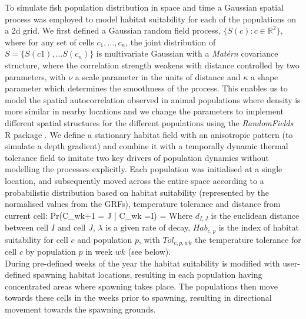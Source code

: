 \documentclass[review]{elsarticle}
\let\oldequation\equation
\let\oldendequation\endequation
\renewenvironment{equation}
 {\linenomathNonumbers\oldequation}
 {\oldendequation\endlinenomath}
\begin{document}
To simulate fish population distribution in space and time a Gaussian spatial
process was employed to model habitat suitability for each of the populations
on a 2d grid.  We first defined a Gaussian random field process, $\{S(c) : c
\in \mathbb{R}^2\}$, where for any set of cells $c_{1}, \dots, c_{n}$, the
joint distribution of $S = \{S(c1),\dots S(c_{n})\}$ is multivariate Gaussian
with a \textit{Matérn} covariance structure, where the correlation strength
weakens with distance controlled by two parameters, with $\nu$ a scale
parameter in the units of distance and $\kappa$ a shape parameter which
determines the smoothness of the process. This enables us to model the spatial
autocorrelation observed in animal populations where density is more similar in
nearby locations \citep{Tobler1970, F.Dormann2007, Poos2007} and we change the
parameters to implement different spatial structures for the different
populations using the \textit{RandomFields} R package \citep{Schlater2015}. We
define a stationary habitat field with an anisotropic pattern (to simulate a
depth gradient) and combine it with a temporally dynamic thermal tolerance
field to imitate two key drivers of population dynamics without modelling the
processes explicitly. Each population was initialised at a single location, and
subsequently moved across the entire space according to a probabilistic
distribution based on habitat suitability (represented by the normalised values
from the GRFs), temperature tolerance and distance from current cell: 
\begin{equation}
	Pr(C_{wk+1} = J | C_{wk} =I) = 
\end{equation}
Where $d_{I,J}$ is the euclidean distance between cell $I$ and cell $J$,
$\lambda$ is a given rate of decay, $Hab_{c,p}$ is the index of habitat
suitability for cell $c$ and population $p$, with $Tol_{c,p,wk}$ the
temperature tolerance for cell $c$ by population $p$ in week $wk$ (see below).
\\

During pre-defined weeks of the year the habitat suitability is modified with
user-defined spawning habitat locations, resulting in each population having
concentrated areas where spawning takes place. The populations then move
towards these cells in the weeks prior to spawning, resulting in directional
movement towards the spawning grounds. \\
\end{document}

